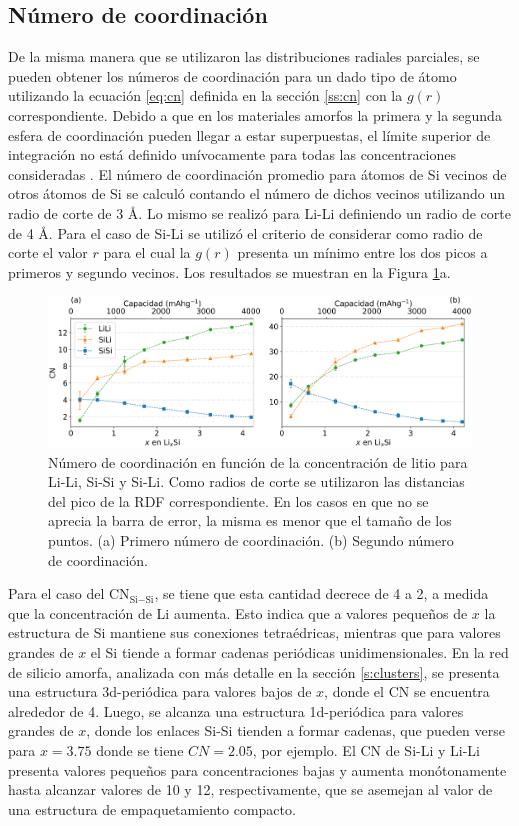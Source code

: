 \subsection{Número de coordinación}

De la misma manera que se utilizaron las distribuciones radiales parciales, se pueden
obtener los números de coordinación para un dado tipo de átomo utilizando la ecuación
\ref{eq:cn} definida en la sección \ref{ss:cn} con la $g(r)$ correspondiente. Debido
a que en los materiales amorfos la primera y la segunda esfera de coordinación pueden 
llegar a estar superpuestas, el límite superior de integración no está definido 
unívocamente para todas las concentraciones consideradas \cite{lamparter1995}.
El número de coordinación promedio para átomos de Si vecinos de otros átomos 
de Si se calculó contando el número de dichos vecinos utilizando un radio de 
corte de 3 \AA. Lo mismo se realizó para Li-Li definiendo un radio de corte de 
4 \AA. Para el caso de Si-Li se utilizó el criterio de considerar como radio de 
corte el valor $r$ para el cual la $g(r)$ presenta un mínimo entre los dos picos
a primeros y segundo vecinos. Los resultados se muestran en la Figura 
\ref{fig:cn}a.
\begin{figure}[h!]
    \centering
    \includegraphics[width=\textwidth]{Silicio/caracterizacion/resultados/cn/cn.png}
    \caption{Número de coordinación en función de la concentración de litio para
    Li-Li, Si-Si y Si-Li. Como radios de corte se utilizaron las distancias 
    del pico de la RDF correspondiente. En los casos en que no se aprecia la barra
    de error, la misma es menor que el tamaño de los puntos. (a) Primero número 
    de coordinación. (b) Segundo número de coordinación.}
    \label{fig:cn}
\end{figure}

Para el caso del CN$_{\text{Si}-\text{Si}}$, se tiene que esta cantidad decrece de 4 a 2, a 
medida que la concentración de Li aumenta. Esto indica que a valores pequeños de 
$x$ la estructura de Si mantiene sus conexiones tetraédricas, mientras que para
valores grandes de $x$ el Si tiende a formar cadenas periódicas unidimensionales.
En la red de silicio amorfa, analizada con más detalle en la sección 
\ref{s:clusters}, se presenta una estructura 3d-periódica para valores bajos de 
$x$, donde el CN se encuentra alrededor de 4. Luego, se alcanza una estructura 1d-periódica 
para valores grandes de $x$, donde los enlaces Si-Si tienden a formar 
cadenas, que pueden verse para $x = 3.75$ donde se tiene $CN = 2.05$, por ejemplo.
El CN de Si-Li y Li-Li presenta valores pequeños para concentraciones 
bajas y aumenta monótonamente hasta alcanzar valores de 10 y 12, respectivamente, 
que se asemejan al valor de una estructura de empaquetamiento compacto.

